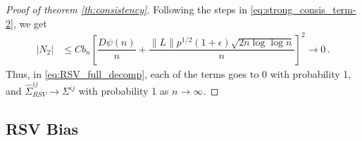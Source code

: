 \documentclass[11pt]{article}
\theoremstyle{remark}
\begin{document}
\begin{proof}[Proof of theorem \ref{th:consistency}]
%
Following the steps in \eqref{eq:strong_consis_term-2}, we get
\begin{align*}
    |N_2| & \leq Cb_n\left[ \dfrac{D \psi(n)}{n} + \dfrac{\|L\| p^{1/2}(1+\epsilon)\sqrt{2n \log\log n}}{n}  \right]^2  \to 0\,.
\end{align*}
Thus, in \eqref{eq:RSV_full_decomp}, each of the terms goes to 0 with probability 1, and $\hat{\Sigma}_{RSV}^{ij} \to \Sigma^{ij}$ with probability 1 as $n \to \infty$. 
\end{proof}









\subsection{RSV Bias}
\end{document}

